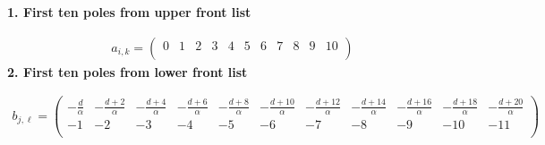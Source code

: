 \documentclass[11pt]{article}
\begin{document}
\noindent\textbf{1. First ten poles from upper front list}

\begin{align*}
  a_{i,k} = 
  \left(
\begin{array}{ccccccccccc}
 0 & 1 & 2 & 3 & 4 & 5 & 6 & 7 & 8 & 9 & 10 \\
\end{array}
\right)
\end{align*}
\noindent\textbf{2. First ten poles from lower front list}

\begin{align*}
  b_{j,\ell} = 
  \left(
\begin{array}{ccccccccccc}
 -\frac{d}{\alpha } & -\frac{d+2}{\alpha } & -\frac{d+4}{\alpha } & -\frac{d+6}{\alpha } & -\frac{d+8}{\alpha } & -\frac{d+10}{\alpha } & -\frac{d+12}{\alpha } & -\frac{d+14}{\alpha } & -\frac{d+16}{\alpha } & -\frac{d+18}{\alpha } & -\frac{d+20}{\alpha } \\
 -1 & -2 & -3 & -4 & -5 & -6 & -7 & -8 & -9 & -10 & -11 \\
\end{array}
\right)
\end{align*}
\end{document}
